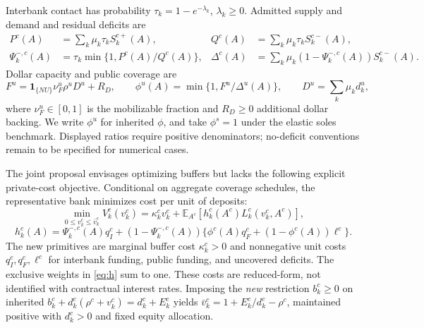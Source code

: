 \documentclass[11pt]{article}
\begin{document}
\newpage
Interbank contact has probability $\tau_k=1-e^{-\lambda_k}$, $\lambda_k\ge0$. Admitted supply and demand and residual deficits are
\begin{align*}
 P^c(A)&=\sum_k\mu_k\tau_kS_k^{c+}(A),&
 Q^c(A)&=\sum_k\mu_k\tau_kS_k^{c-}(A),\\
 \Psi_k^{-,c}(A)&=\tau_k\min\{1,P^c(A)/Q^c(A)\},&
 \Delta^c(A)&=\sum_k\mu_k(1-\Psi_k^{-,c}(A))S_k^{c-}(A).
\end{align*}
Dollar capacity and public coverage are
\[
 F^u=\mathbf1_{\{NU\}}\nu_F^u\rho^uD^u+R_D,
 \qquad \phi^u(A)=\min\{1,F^u/\Delta^u(A)\},
 \qquad D^u=\sum_k\mu_kd_k^u,
\]
where $\nu_F^u\in[0,1]$ is the mobilizable fraction and $R_D\ge0$ additional dollar backing. We write $\phi^u$ for inherited $\phi$, and take $\phi^s=1$ under the elastic soles benchmark. Displayed ratios require positive denominators; no-deficit conventions remain to be specified for numerical cases.

The joint proposal envisages optimizing buffers but lacks the following explicit private-cost objective. Conditional on aggregate coverage schedules, the representative bank minimizes cost per unit of deposits:
\begin{equation}\label{eq:problem}
 \min_{0\le v_k^c\le\bar v_k^c}V_k^c(v_k^c)
 =\kappa_k^c v_k^c+\mathbb E_{A^c}[h_k^c(A^c)L_k^c(v_k^c,A^c)],
\end{equation}
\begin{equation}\label{eq:h}
 h_k^c(A)=\Psi_k^{-,c}(A)q_I^c+
 (1-\Psi_k^{-,c}(A))\{\phi^c(A)q_F^c+(1-\phi^c(A))\ell^c\}.
\end{equation}
The new primitives are marginal buffer cost $\kappa_k^c>0$ and nonnegative unit costs $q_I^c,q_F^c,\ell^c$ for interbank funding, public funding, and uncovered deficits. The exclusive weights in \eqref{eq:h} sum to one. These costs are reduced-form, not identified with contractual interest rates. Imposing the \emph{new} restriction $b_k^c\ge0$ on inherited $b_k^c+d_k^c(\rho^c+v_k^c)=d_k^c+E_k^c$ yields $\bar v_k^c=1+E_k^c/d_k^c-\rho^c$, maintained positive with $d_k^c>0$ and fixed equity allocation.
\end{document}
